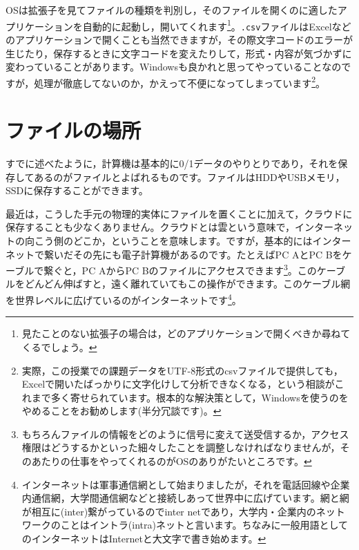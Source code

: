 \documentclass{ltjsbook}
\begin{document}
OSは拡張子を見てファイルの種類を判別し，そのファイルを開くのに適したアプリケーションを自動的に起動し，開いてくれます\footnote{見たことのない拡張子の場合は，どのアプリケーションで開くべきか尋ねてくるでしょう。}。\texttt{.csv}ファイルはExcelなどのアプリケーションで開くことも当然できますが，その際文字コードのエラーが生じたり，保存するときに文字コードを変えたりして，形式・内容が気づかずに変わっていることがあります。Windowsも良かれと思ってやっていることなのですが，処理が徹底してないのか，かえって不便になってしまっています\footnote{実際，この授業での課題データをUTF-8形式のcsvファイルで提供しても，Excelで開いたばっかりに文字化けして分析できなくなる，という相談がこれまで多く寄せられています。根本的な解決策として，Windowsを使うのをやめることをお勧めします(半分冗談です)。}。

\section{ファイルの場所}
すでに述べたように，計算機は基本的に0/1データのやりとりであり，それを保存してあるのがファイルとよばれるものです。ファイルはHDDやUSBメモリ，SSDに保存することができます。

最近は，こうした手元の物理的実体にファイルを置くことに加えて，クラウドに保存することも少なくありません。クラウドとは雲という意味で，インターネットの向こう側のどこか，ということを意味します。ですが，基本的にはインターネットで繋いだその先にも電子計算機があるのです。たとえばPC AとPC Bをケーブルで繋ぐと，PC AからPC Bのファイルにアクセスできます\footnote{もちろんファイルの情報をどのように信号に変えて送受信するか，アクセス権限はどうするかといった細々したことを調整しなければなりませんが，そのあたりの仕事をやってくれるのがOSのありがたいところです。}。このケーブルをどんどん伸ばすと，遠く離れていてもこの操作ができます。このケーブル網を世界レベルに広げているのがインターネットです\footnote{インターネットは軍事通信網として始まりましたが，それを電話回線や企業内通信網，大学間通信網などと接続しあって世界中に広げています。網と網が相互に(inter)繋がっているのでinter netであり，大学内・企業内のネットワークのことはイントラ(intra)ネットと言います。ちなみに一般用語としてのインターネットはInternetと大文字で書き始めます。}。
\end{document}
